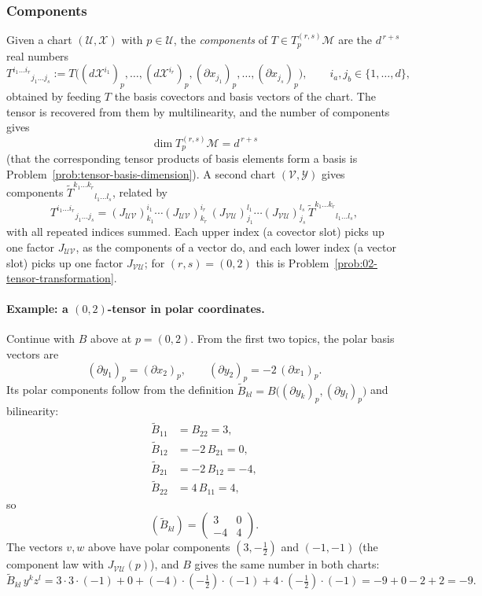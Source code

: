 \documentclass[11pt]{article}
\newcommand{\TprsM}{T_p^{(r,s)}\mathcal M}
\begin{document}
\subsubsection*{Components}
Given a chart $(\mathcal U,\mathcal X)$ with $p\in\mathcal U$, the \emph{components} of $T\in\TprsM$ are the $d^{\,r+s}$ real numbers
\[
T^{i_1\dots i_r}{}_{j_1\dots j_s}:=T\big((d\mathcal X^{i_1})_p,\dots,(d\mathcal X^{i_r})_p,(\partial x_{j_1})_p,\dots,(\partial x_{j_s})_p\big),\qquad i_a,j_b\in\{1,\dots,d\},
\]
obtained by feeding $T$ the basis covectors and basis vectors of the chart. The tensor is recovered from them by multilinearity, and the number of components gives
\[
\dim\TprsM=d^{\,r+s}
\]
(that the corresponding tensor products of basis elements form a basis is Problem~\ref{prob:tensor-basis-dimension}). A second chart $(\mathcal V,\mathcal Y)$ gives components $\widetilde T^{k_1\dots k_r}{}_{l_1\dots l_s}$, related by
\begin{equation}
T^{i_1\dots i_r}{}_{j_1\dots j_s}=(J_{\mathcal{UV}})^{i_1}_{k_1}\cdots(J_{\mathcal{UV}})^{i_r}_{k_r}\,(J_{\mathcal{VU}})^{l_1}_{j_1}\cdots(J_{\mathcal{VU}})^{l_s}_{j_s}\,\widetilde T^{k_1\dots k_r}{}_{l_1\dots l_s},
\tag{4.6}\label{eq:4-tensor-law}
\end{equation}
with all repeated indices summed. Each upper index (a covector slot) picks up one factor $J_{\mathcal{UV}}$, as the components of a vector do, and each lower index (a vector slot) picks up one factor $J_{\mathcal{VU}}$; for $(r,s)=(0,2)$ this is Problem~\ref{prob:02-tensor-transformation}.

\paragraph{Example: a $(0,2)$-tensor in polar coordinates.} Continue with $B$ above at $p=(0,2)$. From the first two topics, the polar basis vectors are
\[
(\partial y_1)_p=(\partial x_2)_p,\qquad(\partial y_2)_p=-2\,(\partial x_1)_p.
\]
Its polar components follow from the definition $\widetilde B_{kl}=B\big((\partial y_k)_p,(\partial y_l)_p\big)$ and bilinearity:
\begin{align*}
\widetilde B_{11}&=B_{22}=3,\\
\widetilde B_{12}&=-2\,B_{21}=0,\\
\widetilde B_{21}&=-2\,B_{12}=-4,\\
\widetilde B_{22}&=4\,B_{11}=4,
\end{align*}
so
\[
(\widetilde B_{kl})=\begin{pmatrix}3&0\\-4&4\end{pmatrix}.
\]
The vectors $v,w$ above have polar components $(3,-\tfrac12)$ and $(-1,-1)$ (the component law with $J_{\mathcal{VU}}(p)$), and $B$ gives the same number in both charts:
\[
\widetilde B_{kl}\,y^kz^l=3\cdot3\cdot(-1)+0+(-4)\cdot(-\tfrac12)\cdot(-1)+4\cdot(-\tfrac12)\cdot(-1)=-9+0-2+2=-9.
\]
\end{document}
